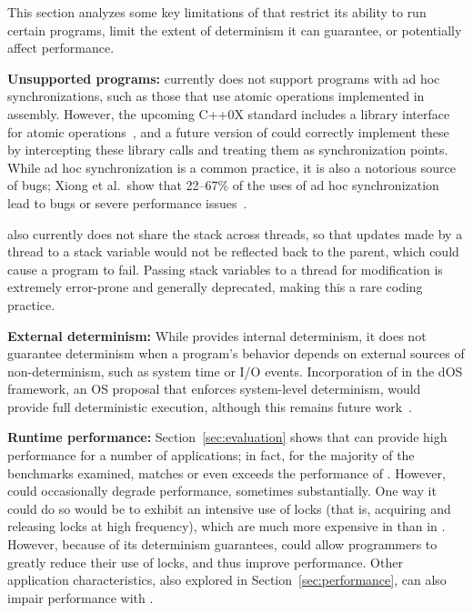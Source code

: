 \label{sec:discussion}

This section analyzes some key limitations of \dthreads{} that restrict its ability to run certain programs, limit the extent of determinism it can guarantee, or potentially affect performance.


\textbf{Unsupported programs: }
\dthreads{} currently does not support programs with ad hoc synchronizations, such as those that use atomic operations implemented in assembly.  However, the upcoming C++0X standard includes a library interface for atomic operations~\cite[pp. 1107--1128]{c++0xstandarddraft}, and a future version of \dthreads{} could correctly implement these by intercepting
these library calls and treating them as synchronization points. While ad hoc synchronization is a common practice, it is also a notorious source of bugs; Xiong et al.\ show that 22--67\% of the uses of ad hoc
synchronization lead to bugs or severe performance issues~\cite{ad-hoc-considered-harmful}.

\dthreads{} also currently does not share the stack
across threads, so that updates made by a thread to a stack variable would not be reflected back to the parent, which could cause a program to fail. Passing stack variables to a thread for modification is extremely error-prone and generally deprecated, making this a rare
coding practice.

\textbf{External determinism: }
While \dthreads{} provides internal determinism, it does not guarantee determinism when a program's behavior depends on external sources of non-determinism, such as system time or I/O events. Incorporation of \dthreads{} in the dOS framework, an OS proposal that enforces system-level determinism, would provide full deterministic execution, although this remains future
work~\cite{deterministic-process-groups}.

\textbf{Runtime performance: }
Section~\ref{sec:evaluation} shows that \dthreads{} can provide high performance for a number of applications; in fact, for the majority of the benchmarks examined, \dthreads{} matches or even exceeds the performance of \pthreads{}. However, \dthreads{} could occasionally
degrade performance, sometimes substantially. One way it could do so would be to exhibit an intensive use of locks (that is, acquiring and releasing locks at high frequency), which are much more expensive
in \dthreads{} than in \pthreads{}. However, because of its determinism guarantees, \dthreads{} could allow programmers to greatly reduce their use of locks, and thus improve performance. Other application characteristics, also explored in Section~\ref{sec:performance}, can also impair performance
with \dthreads{}.



